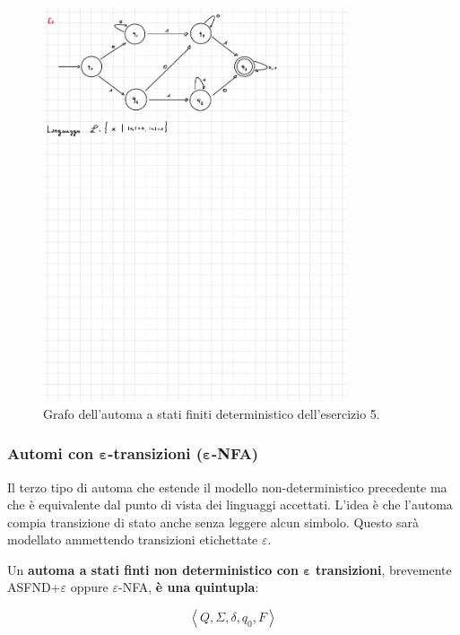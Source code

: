 \documentclass[a4paper]{article}
\begin{document}
	\begin{figure}[!htp]
		\centering
		\includegraphics[width=0.8\textwidth]{img/esercitazioni/01_exe5.pdf}
		\caption{Grafo dell'automa a stati finiti deterministico dell'esercizio 5.}\label{ASFD-esercizio_5}
	\end{figure}

	\newpage
	
	\subsubsection{Automi con $\boldsymbol{\varepsilon}$-transizioni ($\boldsymbol{\varepsilon}$-NFA)}
	
	Il terzo tipo di automa che estende il modello non-deterministico precedente ma che è equivalente dal punto di vista dei linguaggi accettati. L'idea è che l'automa compia transizione di stato anche senza leggere alcun simbolo. Questo sarà modellato ammettendo transizioni etichettate $\varepsilon$.
	
	Un \textcolor{Red3}{\textbf{automa a stati finti non deterministico con $\boldsymbol{\varepsilon}$ transizioni}}, brevemente ASFND+$\varepsilon$ oppure $\varepsilon$-NFA, \textcolor{Red3}{\textbf{è una quintupla}}:
	
	\begin{equation*}
		\left\langle Q, \Sigma, \delta, q_{0}, F \right\rangle
	\end{equation*}
\end{document}

